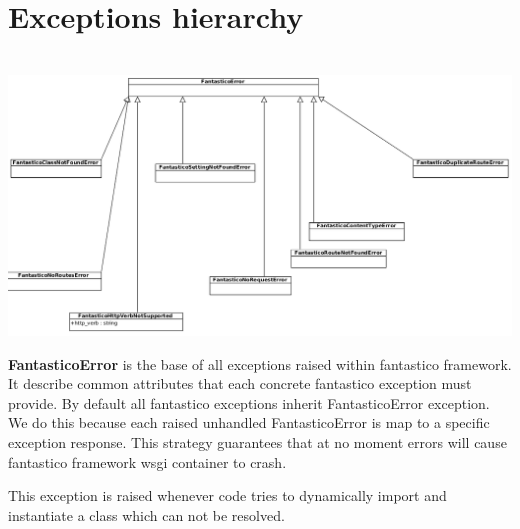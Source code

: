 \documentclass[letterpaper,10pt,english]{sphinxmanual}
\begin{document}
\section{Exceptions hierarchy}
\label{features/exceptions:exceptions-hierarchy}\label{features/exceptions::doc}

\begin{fulllineitems}
\label{features/exceptions:fantastico.exceptions.FantasticoError}~
\includegraphics{exceptions.png}

\textbf{FantasticoError} is the base of all exceptions raised within fantastico framework. It describe common attributes that
each concrete fantastico exception must provide. By default all fantastico exceptions inherit FantasticoError exception. 
We do this because each raised unhandled FantasticoError is map to a specific exception response. This strategy guarantees
that at no moment errors will cause fantastico framework wsgi container to crash.

\end{fulllineitems}


\begin{fulllineitems}
\label{features/exceptions:fantastico.exceptions.FantasticoClassNotFoundError}
This exception is raised whenever code tries to dynamically import and instantiate a class which can not be resolved.

\end{fulllineitems}

\end{document}
